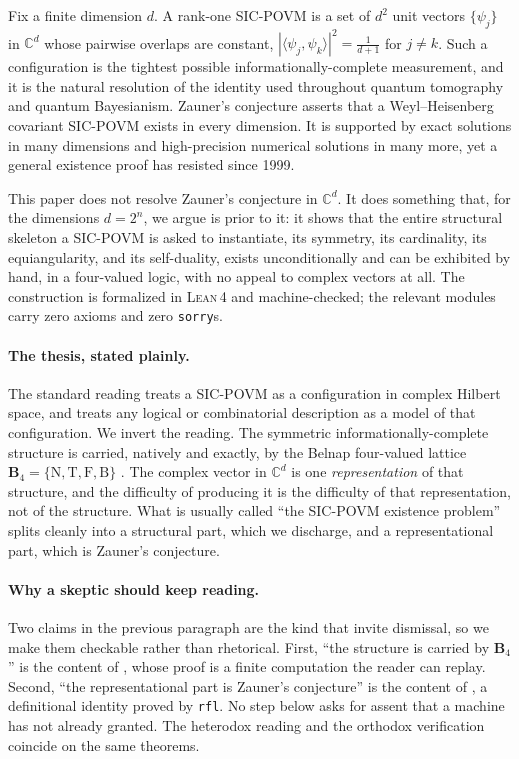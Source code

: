\documentclass[12pt,a4paper]{article}
\newcommand{\BFour}{\mathbf{B}_4}
\newcommand{\Lean}{\textsc{Lean\,4}}
\begin{document}
Fix a finite dimension $d$. A rank-one SIC-POVM is a set of $d^2$ unit vectors
$\{\psi_j\}$ in $\mathbb{C}^d$ whose pairwise overlaps are constant,
$|\langle \psi_j, \psi_k\rangle|^2 = \tfrac{1}{d+1}$ for $j \neq k$. Such a
configuration is the tightest possible informationally-complete measurement,
and it is the natural resolution of the identity used throughout quantum
tomography and quantum Bayesianism. Zauner's conjecture \cite{Zauner1999}
asserts that a Weyl--Heisenberg covariant SIC-POVM exists in every dimension.
It is supported by exact solutions in many dimensions and high-precision
numerical solutions in many more, yet a general existence proof has resisted
since 1999.

This paper does not resolve Zauner's conjecture in $\mathbb{C}^d$. It does
something that, for the dimensions $d = 2^n$, we argue is prior to it: it shows
that the entire structural skeleton a SIC-POVM is asked to instantiate, its
symmetry, its cardinality, its equiangularity, and its self-duality, exists
unconditionally and can be exhibited by hand, in a four-valued logic, with no
appeal to complex vectors at all. The construction is formalized in \Lean{}
\cite{Lean4} and machine-checked; the relevant modules carry zero axioms and
zero \texttt{sorry}s.

\paragraph{The thesis, stated plainly.}
The standard reading treats a SIC-POVM as a configuration in complex Hilbert
space, and treats any logical or combinatorial description as a model of that
configuration. We invert the reading. The symmetric informationally-complete
structure is carried, natively and exactly, by the Belnap four-valued lattice
$\BFour = \{\mathrm{N},\mathrm{T},\mathrm{F},\mathrm{B}\}$
\cite{Belnap1977}. The complex vector in $\mathbb{C}^d$ is one
\emph{representation} of that structure, and the difficulty of producing it is
the difficulty of that representation, not of the structure. What is usually
called ``the SIC-POVM existence problem'' splits cleanly into a structural part,
which we discharge, and a representational part, which is Zauner's conjecture.

\paragraph{Why a skeptic should keep reading.}
Two claims in the previous paragraph are the kind that invite dismissal, so we
make them checkable rather than rhetorical. First, ``the structure is carried
by $\BFour$'' is the content of , whose proof is a
finite computation the reader can replay. Second, ``the representational part
is Zauner's conjecture'' is the content of , a
definitional identity proved by \texttt{rfl}. No step below asks for
assent that a machine has not already granted. The heterodox reading and the
orthodox verification coincide on the same theorems.
\end{document}
